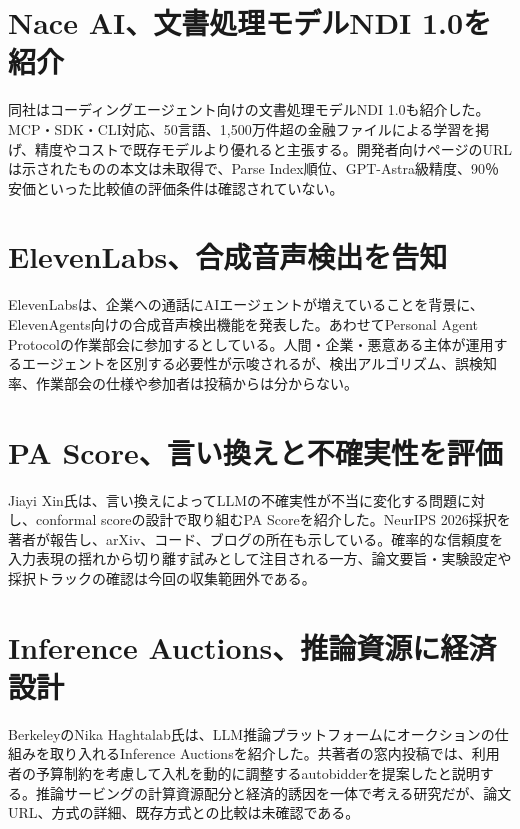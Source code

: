 \section{Nace AI、文書処理モデルNDI 1.0を紹介}
同社はコーディングエージェント向けの文書処理モデルNDI 1.0も紹介した。MCP・SDK・CLI対応、50言語、1,500万件超の金融ファイルによる学習を掲げ、精度やコストで既存モデルより優れると主張する。開発者向けページのURLは示されたものの本文は未取得で、Parse Index順位、GPT-Astra級精度、90％安価といった比較値の評価条件は確認されていない。

\section{ElevenLabs、合成音声検出を告知}
ElevenLabsは、企業への通話にAIエージェントが増えていることを背景に、ElevenAgents向けの合成音声検出機能を発表した。あわせてPersonal Agent Protocolの作業部会に参加するとしている。人間・企業・悪意ある主体が運用するエージェントを区別する必要性が示唆されるが、検出アルゴリズム、誤検知率、作業部会の仕様や参加者は投稿からは分からない。

\section{PA Score、言い換えと不確実性を評価}
Jiayi Xin氏は、言い換えによってLLMの不確実性が不当に変化する問題に対し、conformal scoreの設計で取り組むPA Scoreを紹介した。NeurIPS 2026採択を著者が報告し、arXiv、コード、ブログの所在も示している。確率的な信頼度を入力表現の揺れから切り離す試みとして注目される一方、論文要旨・実験設定や採択トラックの確認は今回の収集範囲外である。

\section{Inference Auctions、推論資源に経済設計}
BerkeleyのNika Haghtalab氏は、LLM推論プラットフォームにオークションの仕組みを取り入れるInference Auctionsを紹介した。共著者の窓内投稿では、利用者の予算制約を考慮して入札を動的に調整するautobidderを提案したと説明する。推論サービングの計算資源配分と経済的誘因を一体で考える研究だが、論文URL、方式の詳細、既存方式との比較は未確認である。


